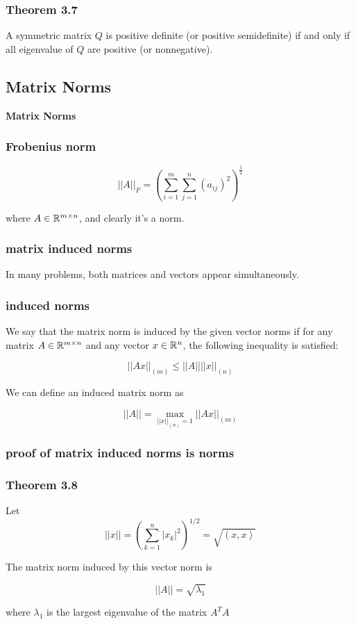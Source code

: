 \begin{frame}
	\frametitle{Theorem 3.7}

	A symmetric matrix $Q$ is positive definite (or positive semidefinite) if and only if all eigenvalue of $Q$ are positive (or nonnegative).
\end{frame}

\begin{frame}
	\section{Matrix Norms}
	\begin{center}
	\textbf{Matrix Norms}
	\end{center}
\end{frame}


\begin{frame}
	\frametitle{Frobenius norm}

	$$||A||_F = \left( \sum\limits_{i=1}^{m}\sum\limits_{j=1}^{n}\left(a_{ij}\right)^2\right)^{\frac{1}{2}}$$

	where $A \in \mathbb{R}^{m \times n}$, and clearly it's a norm.

\end{frame}

\begin{frame}
	\frametitle{matrix induced norms}

	In many problems, both matrices and vectors appear simultaneously.

\end{frame}

\begin{frame}
	\frametitle{induced norms}

	We say that the matrix norm is induced by the given vector norms if for any matrix $A \in \mathbb{R}^{m \times n}$ and any vector $x \in \mathbb{R}^n$, the following inequality is satisfied:

	$$||Ax||_{(m)} \leq ||A||||x||_{(n)}$$

	We can define an induced matrix norm as

	$$||A|| = \max\limits_{||x||_{(n)}=1}||Ax||_{(m)}$$
\end{frame}

\begin{frame}
	\frametitle{proof of matrix induced norms is norms}
\end{frame}

\begin{frame}
	\frametitle{Theorem 3.8}

	Let
	$$||x|| = \left( \sum\limits^n_{k=1}|x_k|^2\right)^{1/2} = \sqrt{\left( x,x\right>}$$

	The matrix norm induced by this vector norm is

	$$||A|| = \sqrt{\lambda_1}$$

	where $\lambda_1$ is the largest eigenvalue of the matrix $A^TA$
\end{frame}

